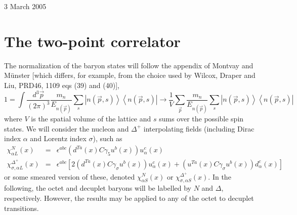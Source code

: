 \documentclass[12pt]{article}
\begin{document}
\begin{center}
\vspace{2mm}

3 March 2005
\end{center}

\section{The two-point correlator}

The normalization of the baryon states will follow the appendix of
Montvay and M\"unster [which differs, for example, from the choice used by
Wilcox, Draper and Liu, PRD46, 1109 eqs (39) and (40)],
\[
1 = \int\frac{d^3\vec{p}}{(2\pi)^3}\frac{m_n}{E_{n(\vec p)}}
    \sum_s\left|n(\vec{p},s)\right>\left<n(\vec{p},s)\right|
\to \frac{1}{V}\sum_{\vec p}\frac{m_n}{E_{n(\vec p)}}
    \sum_s\left|n(\vec{p},s)\right>\left<n(\vec{p},s)\right|
\]
where $V$ is the spatial volume of the lattice and $s$ sums over the
possible spin states.
We will consider the nucleon and $\Delta^+$ interpolating fields
(including Dirac index $\alpha$ and Lorentz index $\sigma$), such as
\begin{eqnarray*}
\chi^N_{\alpha L}(x) &=&
    \epsilon^{abc}\left(d^{Ta}(x)C\gamma_5u^b(x)\right)u_\alpha^c(x) \\
\chi^{\Delta^+}_{\sigma,\alpha L}(x) &=&
    \epsilon^{abc}\left[2\left(d^{Ta}(x)C\gamma_\sigma u^b(x)\right)u_\alpha^c(x)
                        +\left(u^{Ta}(x)C\gamma_\sigma u^b(x)\right)d_\alpha^c(x)\right]
\end{eqnarray*}
or some smeared version of these, denoted $\chi^N_{\alpha S}(x)$ or $\chi^{\Delta^+}_{\sigma,\alpha S}(x)$.
In the following, the octet and decuplet baryons will be labelled by $N$ and $\Delta$, respectively.
However, the results may be applied to any of the octet to decuplet transitions.
\end{document}
